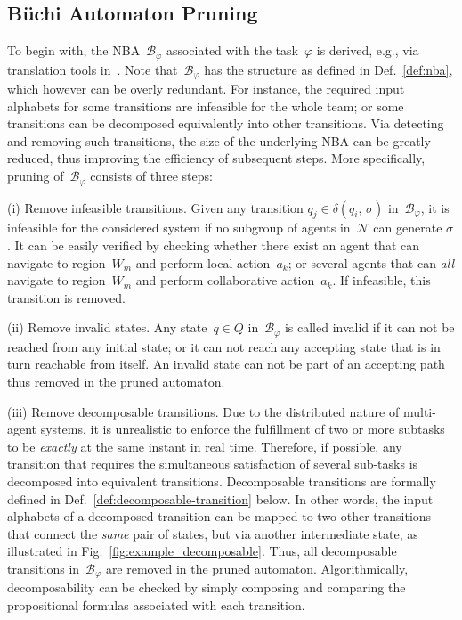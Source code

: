 \subsection{B\"{u}chi Automaton Pruning}
\label{subsubsec:NBA-pruning}
To begin with, the NBA~$\mathcal{B}_{\varphi}$ associated with the task~$\varphi$
is derived, e.g., via translation tools in~\citep{gastin2001fast}.
Note that~$\mathcal{B}_{\varphi}$ has the structure as defined in Def.~\ref{def:nba},
which however can be overly redundant.
For instance, the required input alphabets for some transitions are infeasible for the whole team;
or some transitions can be decomposed equivalently
into other transitions.
Via detecting and removing such transitions, the size of the underlying NBA
can be greatly reduced, thus improving the efficiency of subsequent steps.
More specifically, pruning of~$\mathcal{B}_{\varphi}$ consists of three steps:

(i) Remove infeasible transitions.
Given any transition $q_j \in \delta(q_i,\, \sigma)$ in~$\mathcal{B}_{\varphi}$,
it is infeasible for the considered system if
no subgroup of agents in~$\mathcal{N}$ can generate $\sigma$.
It can be easily verified by checking whether there exist an agent that can navigate to region~$W_m$ and perform local action~$a_k$;
or several agents that can \emph{all} navigate to region~$W_m$ and perform collaborative action~$a_k$.
If infeasible, this transition is removed.

(ii) Remove invalid states.
Any state~$q\in Q$ in~$\mathcal{B}_{\varphi}$ is called invalid
if it can not be reached from any initial state;
or it can not reach any accepting state that is in turn reachable from itself.
An invalid state can not be part of an accepting path thus removed in the pruned automaton.

(iii) Remove decomposable transitions.
Due to the distributed nature of multi-agent systems,
it is unrealistic to enforce the fulfillment of two or more subtasks
to be \emph{exactly} at the same instant in real time.
Therefore, if possible,
any transition that requires the simultaneous satisfaction of several sub-tasks is decomposed into equivalent transitions.
Decomposable transitions are formally defined in
Def.~\ref{def:decomposable-transition} below.
In other words, the input alphabets of a decomposed transition can be mapped to
two other transitions that connect the \emph{same} pair of states,
but via another intermediate state, as illustrated in Fig.~\ref{fig:example_decomposable}.
Thus, all decomposable transitions in~$\mathcal{B}_{\varphi}$ are removed in the pruned automaton.
Algorithmically, decomposability can be checked by simply composing and comparing the
propositional formulas associated with each transition.

